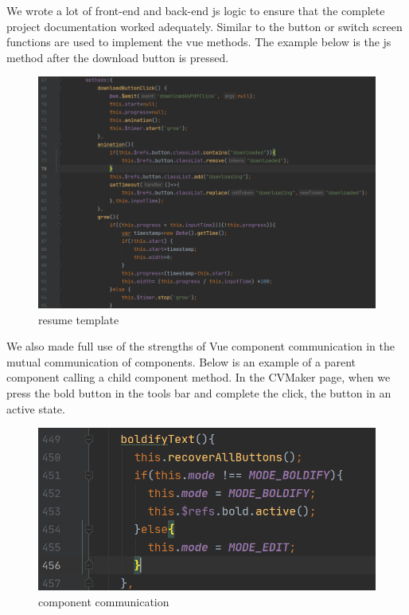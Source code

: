 \documentclass[11pt]{article}
\begin{document}
\begin{spacing}{1.0}
	We wrote a lot of front-end and back-end js logic to ensure that the complete project documentation worked adequately. Similar to the button or switch screen functions are used to implement the vue methods. The example below is the js method after the download button is pressed.
	 \begin{figure}[H]
		\centering
		\includegraphics[scale=.4]{figures/downloadButtonJS.png}
		\caption{resume template}
		\label{fig:14}
	\end{figure}
	

We also made full use of the strengths of Vue component communication in the mutual communication of components. Below is an example of a parent component calling a child component method. In the CVMaker page, when we press the bold button in the tools bar and complete the click, the button in an active state.

	\begin{figure}[H]
	\centering
	\includegraphics[scale=.3]{figures/componentsRefs.png}
	\caption{component communication}
	\label{fig:9}
\end{figure}	
	

\end{spacing}
\end{document}
